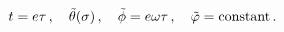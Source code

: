 \begin{equation}
\label{conf3}
t=e \tau\,,\quad \tilde{\theta}(\sigma)\,,\quad
\tilde{\phi}= e \omega \tau\,,\quad \tilde{\varphi}={\rm constant}\,.
\end{equation}

